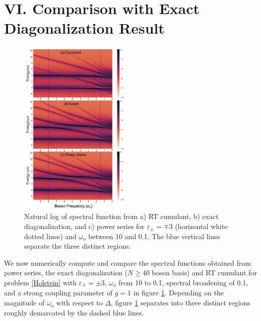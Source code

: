 \documentclass[%
 reprint,
 amsmath,amssymb,
 aps,prl,
floatfix
]{revtex4-2}
\begin{document}
\section{VI. Comparison with Exact Diagonalization Result}
\begin{figure}[htp]
    \includegraphics[height = 11.6 cm,width = 0.47\textwidth]{Final_Diagram_abs.png}
    \caption{Natural log of spectral function from a) RT cumulant, b) exact diagonalization, and c) power series for $\varepsilon_\pm = \mp3$ (horizontal white dotted lines) and $\omega_o$ between 10 and 0.1. The blue vertical lines separate the three distinct regions.}
    \label{three graphs}
\end{figure}
We now numerically compute and compare the spectral functions obtained from power series, the exact diagonalization ($N\geq40$ boson basis) and RT cumulant for problem \eqref{Holstein} with $\varepsilon_\mp = \pm 3$, $\omega_o$ from 10 to 0.1, spectral broadening of 0.1, and a strong coupling parameter of $g=1$ in figure \ref{three graphs}. Depending on the magnitude of $\omega_o$ with respect to $\Delta$, figure \ref{three graphs} separates into three distinct regions roughly demarcated by the dashed blue lines.
\end{document}
